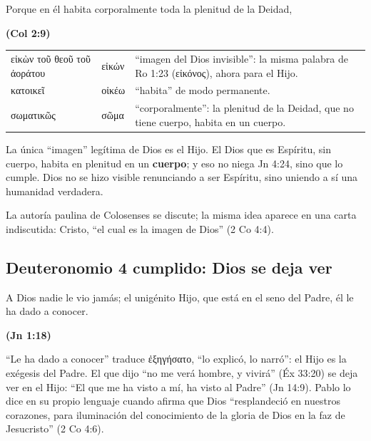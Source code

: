 \documentclass[11pt,letterpaper]{article}
\newcommand{\grc}[1]{\foreignlanguage{ancientgreek}{#1}}
\newcommand{\fuente}[1]{\par\hfill{\upshape\bfseries\small\textcolor{azul}{#1}}}
\newcommand{\destacar}[1]{\textbf{\textcolor{azul}{#1}}}
\begin{document}
\begin{cita}Porque en él habita corporalmente toda la plenitud de la Deidad,\fuente{(Col 2:9)}\end{cita}

\begin{filologia}[Col 1:15 y 2:9]
\begin{tabular}{@{}L{4.2cm}L{1.6cm}L{9.0cm}@{}}
\grc{εἰκὼν τοῦ θεοῦ τοῦ ἀοράτου} & \grc{εἰκών} & ``imagen del Dios invisible'': la misma palabra de Ro 1:23 (\grc{εἰκόνος}), ahora para el Hijo. \\[2pt]
\grc{κατοικεῖ} & \grc{οἰκέω} & ``habita'' de modo permanente. \\[2pt]
\grc{σωματικῶς} & \grc{σῶμα} & ``corporalmente'': la plenitud de la Deidad, que no tiene cuerpo, habita en un cuerpo. \\
\end{tabular}
\end{filologia}

La única ``imagen'' legítima de Dios es el Hijo. El Dios que es Espíritu, sin cuerpo, habita en plenitud en un \destacar{cuerpo}; y eso no niega Jn 4:24, sino que lo cumple. Dios no se hizo visible renunciando a ser Espíritu, sino uniendo a sí una humanidad verdadera.

\begin{nota}[Precisión]
La autoría paulina de Colosenses se discute; la misma idea aparece en una carta indiscutida: Cristo, ``el cual es la imagen de Dios'' (2 Co 4:4).
\end{nota}

\subsection{Deuteronomio 4 cumplido: Dios se deja ver}

\begin{cita}A Dios nadie le vio jamás; el unigénito Hijo, que está en el seno del Padre, él le ha dado a conocer.\fuente{(Jn 1:18)}\end{cita}

``Le ha dado a conocer'' traduce \grc{ἐξηγήσατο}, ``lo explicó, lo narró'': el Hijo es la exégesis del Padre. El que dijo ``no me verá hombre, y vivirá'' (Éx 33:20) se deja ver en el Hijo: ``El que me ha visto a mí, ha visto al Padre'' (Jn 14:9). Pablo lo dice en su propio lenguaje cuando afirma que Dios ``resplandeció en nuestros corazones, para iluminación del conocimiento de la gloria de Dios en la faz de Jesucristo'' (2 Co 4:6).
\end{document}
